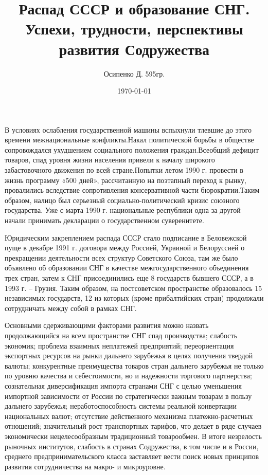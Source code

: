 \documentclass[a4paper, 12pt]{article}
\title{Распад СССР и образование СНГ. Успехи, трудности, перспективы развития Содружества}
\author{Осипенко Д. 595гр.}
\date{\today}
\begin{document}
\sffamily
\maketitle
В условиях ослабления государственной машины вспыхнули тлевшие до этого времени межнациональные конфликты.Накал политической борьбы в обществе сопровождался ухудшением социального положения граждан.Всеобщий дефицит товаров, спад уровня жизни населения привели к началу широкого забастовочного движения по всей стране.Попытки летом 1990 г. провести в жизнь программу «500 дней», рассчитанную на поэтапный переход к рынку, провалились вследствие сопротивления консервативной части бюрократии.Таким образом, налицо был серьезный социально-политический кризис союзного государства. Уже с марта 1990 г. национальные республики одна за другой начали принимать декларации о государственном суверенитете.

Юридическим закреплением распада СССР стало подписание в Беловежской пуще в декабре 1991 г. договора между Россией, Украиной и Белоруссией о прекращении деятельности всех структур Советского Союза, там же было объявлено об образовании СНГ в качестве межгосударственного объединения трех стран, затем к СНГ присоединились еще 8 государств бывшего СССР, а в 1993 г. – Грузия. Таким образом, на постсоветском пространстве образовалось 15 независимых государств, 12 из которых (кроме прибалтийских стран) продолжали сотрудничать между собой в рамках СНГ.

Основными сдерживающими факторами развития можно назвать продолжающийся на всем пространстве СНГ спад производства; слабость экономик; проблема взаимных неплатежей предприятий; переориентация экспортных ресурсов на рынки дальнего зарубежья в целях получения твердой валюты; конкурентные преимущества товаров стран дальнего зарубежья не только по уровню качества и себестоимости, но и надежности торгового партнерства; сознательная диверсификация импорта странами СНГ с целью уменьшения импортной зависимости от России по стратегически важным товарам в пользу дальнего зарубежья; неработоспособность системы реальной конвертации национальных валют; отсутствие действенного механизма платежно-расчетных отношений; значительный рост транспортных тарифов, что делает в ряде случаев экономически нецелесообразным традиционный товарообмен. В итоге незрелость рыночных институтов, слабость в странах Содружества, в том числе и в России, среднего предпринимательского класса заставляет вести поиск новых принципов развития сотрудничества на макро- и микроуровне. 
\end{document}
